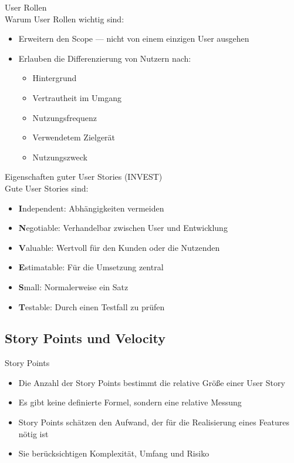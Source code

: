 \begin{concept}{User Rollen}\\
    Warum User Rollen wichtig sind:
    \begin{itemize}
        \item Erweitern den Scope — nicht von einem einzigen User ausgehen
        \item Erlauben die Differenzierung von Nutzern nach:
        \begin{itemize}
            \item Hintergrund
            \item Vertrautheit im Umgang
            \item Nutzungsfrequenz
            \item Verwendetem Zielgerät
            \item Nutzungszweck
        \end{itemize}
    \end{itemize}
\end{concept}

\begin{concept}{Eigenschaften guter User Stories (INVEST)}\\
    Gute User Stories sind:
    \begin{itemize}
        \item \textbf{I}ndependent: Abhängigkeiten vermeiden
        \item \textbf{N}egotiable: Verhandelbar zwischen User und Entwicklung
        \item \textbf{V}aluable: Wertvoll für den Kunden oder die Nutzenden
        \item \textbf{E}stimatable: Für die Umsetzung zentral
        \item \textbf{S}mall: Normalerweise ein Satz
        \item \textbf{T}estable: Durch einen Testfall zu prüfen
    \end{itemize}
\end{concept}

\subsection{Story Points und Velocity}

\begin{definition}{Story Points}\\
    \begin{itemize}
        \item Die Anzahl der Story Points bestimmt die relative Größe einer User Story
        \item Es gibt keine definierte Formel, sondern eine relative Messung
        \item Story Points schätzen den Aufwand, der für die Realisierung eines Features nötig ist
        \item Sie berücksichtigen Komplexität, Umfang und Risiko
    \end{itemize}
\end{definition}

